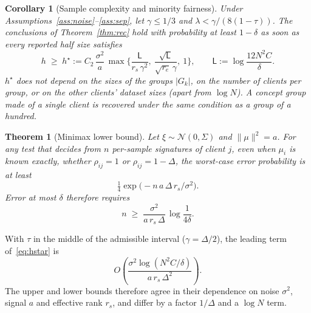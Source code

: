 \documentclass[11pt]{article}
\newtheorem{theorem}{Theorem}
\newtheorem{corollary}{Corollary}
\theoremstyle{definition}
\theoremstyle{remark}
\begin{document}
\begin{corollary}[Sample complexity and minority fairness]\label{cor:sc}
Under Assumptions~\ref{ass:noise}--\ref{ass:sep}, let $\gamma\le1/3$ and $\lambda<\gamma/(8(1-\tau))$. The conclusions of Theorem~\ref{thm:rec} hold with probability at least $1-\delta$ as soon as every reported half size satisfies
\begin{equation}\label{eq:hstar}
h\;\ge\;h^\star:=C_2\,\frac{\sigma^2}{a}\,
\max\Big\{\frac{\mathsf L}{r_s\,\gamma^2},\ \frac{\sqrt{\mathsf L}}{\sqrt{r_e}\,\gamma},\ 1\Big\},
\qquad \mathsf L:=\log\frac{12N^2C}{\delta}.
\end{equation}
$h^\star$ does not depend on the sizes of the groups $|G_k|$, on the number of clients per group, or on the other clients' dataset sizes (apart from $\log N$). A concept group made of a \emph{single} client is recovered under the same condition as a group of a hundred.
\end{corollary}

\begin{theorem}[Minimax lower bound]\label{thm:lb}
Let $\xi\sim\mathcal N(0,\Sigma)$ and $\|\mu\|^2=a$. For any test that decides from $n$ per-sample signatures of client $j$, even when $\mu_i$ is known exactly, whether $\rho_{ij}=1$ or $\rho_{ij}=1-\Delta$, the worst-case error probability is at least
\[
\tfrac14\exp\!\big(-n\,a\,\Delta\,r_s/\sigma^2\big).
\]
Error at most $\delta$ therefore requires
\[
n\;\ge\;\frac{\sigma^2}{a\,r_s\,\Delta}\,\log\frac1{4\delta}.
\]
\end{theorem}
With $\tau$ in the middle of the admissible interval ($\gamma=\Delta/2$), the leading term of~\eqref{eq:hstar} is
\[
O\!\left(\frac{\sigma^2\log(N^2C/\delta)}{a\,r_s\,\Delta^2}\right).
\]
The upper and lower bounds therefore agree in their dependence on noise $\sigma^2$, signal $a$ and effective rank $r_s$, and differ by a factor $1/\Delta$ and a $\log N$ term.
\end{document}
